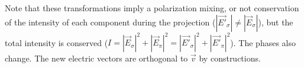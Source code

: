 \documentclass{iucr}
\begin{document}







Note that these transformations imply a polarization mixing, or not conservation of the intensity of each component during the projection ($|\vec{E'}_\sigma| \ne |\vec{E}_\sigma|$),
but the total intensity is conserved ($I=|\vec{E}_\sigma|^2+|\vec{E}_\pi|^2=
|\vec{E'}_\sigma|^2+|\vec{E'}_\pi|^2$). The phases also change.
The new electric vectors are orthogonal to $\vec{v}$ by constructions.
\end{document}
